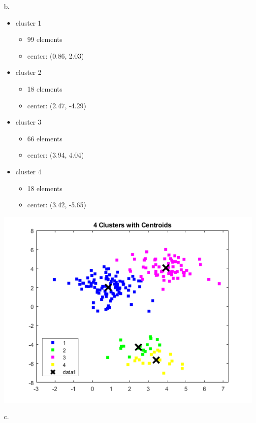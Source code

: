 \documentclass{article}
\begin{document}
\noindent
b. 
\begin{itemize}
    \item cluster 1
    \begin{itemize}
        \item 99 elements
        \item center: (0.86, 2.03)
    \end{itemize}
    \item cluster 2
    \begin{itemize}
        \item 18 elements
        \item center:  (2.47, -4.29)
    \end{itemize}
    \item cluster 3
    \begin{itemize}
        \item 66 elements
        \item center: (3.94, 4.04)
    \end{itemize}
    \item cluster 4
    \begin{itemize}
        \item 18 elements
        \item center: (3.42, -5.65)
    \end{itemize}
\end{itemize}

\begin{center}
    \includegraphics[scale=1]{1b.png}
\end{center}


\noindent
c.
\end{document}
